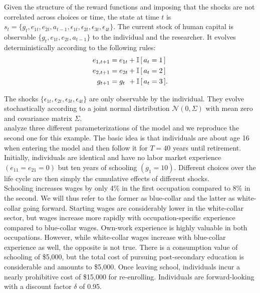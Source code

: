 \noindent Given the structure of the reward functions and imposing that the shocks are not correlated across choices or time, the state at time $t$ is $s_t = \{g_t,e_{1t},e_{2t},a_{t - 1},\epsilon_{1t},\epsilon_{2t},\epsilon_{3t},\epsilon_{4t}\}$.
%
The current stock of human capital is observable $\{g_t,e_{1t},e_{2t},a_{t - 1}\}$ to the individual and the researcher. It evolves deterministically according to the following rules:
%
\begin{align*}
    e_{1,t+1} &= e_{1t} + \mathbb{I}\,[\,a_t = 1\,] \\
    e_{2,t+1} &= e_{2t} + \mathbb{I}\,[\,a_t = 2\,] \\
    g_{t+1}   &= g_{t\phantom{2}}    +  \mathbb{I}\,[\,a_t = 3\,].
\end{align*}

\noindent The shocks $\{\epsilon_{1t},\epsilon_{2t},\epsilon_{3t},\epsilon_{4t}\}$ are only observable by the individual. They evolve stochastically according to a joint normal distribution  $\mathcal{N}(0, \Sigma)$ with mean zero and covariance matrix $\Sigma$.\\

\noindent \citet{Keane.1994} analyze three different parameterizations of the model and we reproduce the second one for this example. The basic idea is that individuals are about age 16 when entering the model and then follow it for $T = 40$ years until retirement. Initially, individuals are identical and have no labor market experience $(e_{11} = e_{21} = 0)$ but ten years of schooling $(g_1 = 10)$. Different choices over the life cycle are then simply the cumulative effects of different shocks.\\

\noindent Schooling increases wages by only 4\% in the first occupation compared to 8\% in the second. We will thus refer to the former as blue-collar and the latter as white-collar going forward. Starting wages are considerably lower in the white-collar sector, but wages increase more rapidly with occupation-specific experience compared to blue-collar wages. Own-work experience is highly valuable in both occupations. However, while white-collar wages increase with blue-collar experience as well, the opposite is not true. There is a consumption value of schooling of \$5,000, but the total cost of pursuing post-secondary education is considerable and amounts to \$5,000. Once leaving school, individuals incur a nearly prohibitive cost of \$15,000 for re-enrolling. Individuals are forward-looking with a discount factor $\delta$ of 0.95.\\

